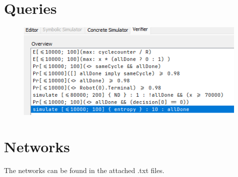 \begin{appendices}
    \section{Queries}
    \label{ExampleLabel}
    \begin{figure}[H]
    \centering
    \includegraphics[width=\linewidth]{pictures/Queries.png}
    \label{fig:model}
\end{figure}
    \section{Networks}
    The networks can be found in the attached .txt files.
\end{appendices}